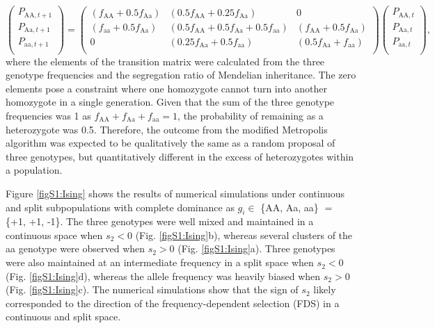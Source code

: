 \documentclass[12pt,]{article}
\begin{document}
$$
\left( \begin{array}{cc} 
    P_{\mathrm{AA},t+1}\\ 
    P_{\mathrm{Aa},t+1}\\
    P_{\mathrm{aa},t+1}\\
    \end{array} \right) 
    =
\left(\begin{array}{ccc}
    (f_\mathrm{AA}+0.5f_\mathrm{Aa}) & (0.5f_\mathrm{AA}+0.25f_\mathrm{Aa}) & 0\\ 
    (f_\mathrm{aa}+0.5f_\mathrm{Aa}) & (0.5f_\mathrm{AA}+0.5f_\mathrm{Aa}+0.5f_\mathrm{aa}) & (f_\mathrm{AA}+0.5f_\mathrm{Aa})\\
    0 & (0.25f_\mathrm{Aa}+0.5f_\mathrm{aa}) & (0.5f_\mathrm{Aa}+f_\mathrm{aa})\\
    \end{array} \right) 
\left( \begin{array}{cc} 
    P_{\mathrm{AA},t}\\ 
    P_{\mathrm{Aa},t}\\
    P_{\mathrm{aa},t}\\
    \end{array} \right),
$$
\noindent
where the elements of the transition matrix were calculated from the three genotype frequencies and the segregation ratio of Mendelian inheritance. The zero elements pose a constraint where one homozygote cannot turn into another homozygote in a single generation. Given that the sum of the three genotype frequencies was 1 as $f_\mathrm{AA}+f_\mathrm{Aa}+f_\mathrm{aa}=1$, the probability of remaining as a heterozygote was 0.5. Therefore, the outcome from the modified Metropolis algorithm was expected to be qualitatively the same as a random proposal of three genotypes, but quantitatively different in the excess of heterozygotes within a population.

Figure \ref{figS1:Ising} shows the results of numerical simulations under continuous and split subpopulations with complete dominance as $g_i \in$ \{AA, Aa, aa\} $=$ \{+1, +1, -1\}. The three genotypes were well mixed and maintained in a continuous space when $s_2<0$ (Fig. \ref{figS1:Ising}b), whereas several clusters of the aa genotype were observed when $s_2>0$ (Fig. \ref{figS1:Ising}a). Three genotypes were also maintained at an intermediate frequency in a split space when $s_2<0$ (Fig. \ref{figS1:Ising}d), whereas the allele frequency was heavily biased when $s_2>0$ (Fig. \ref{figS1:Ising}c). The numerical simulations show that the sign of $s_2$ likely corresponded to the direction of the frequency-dependent selection (FDS) in a continuous and split space.
\end{document}
